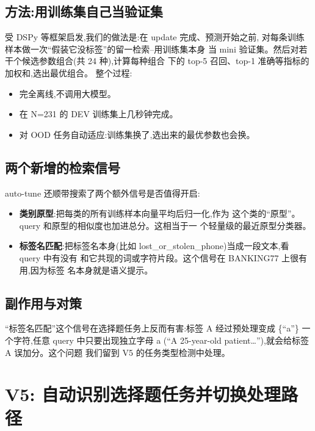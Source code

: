 \documentclass[10pt,twocolumn,letterpaper]{article}
\begin{document}
\subsection{方法:用训练集自己当验证集}
受 DSPy 等框架启发,我们的做法是:在 update 完成、预测开始之前,
对每条训练样本做一次``假装它没标签''的留一检索--用训练集本身
当 mini 验证集。然后对若干个候选参数组合(共 24 种),计算每种组合
下的 top-5 召回、top-1 准确等指标的加权和,选出最优组合。
整个过程:
\begin{itemize}[leftmargin=*,itemsep=1pt,topsep=2pt]
\item 完全离线,不调用大模型。
\item 在 N=231 的 DEV 训练集上几秒钟完成。
\item 对 OOD 任务自动适应:训练集换了,选出来的最优参数也会换。
\end{itemize}

\subsection{两个新增的检索信号}
auto-tune 还顺带搜索了两个额外信号是否值得开启:
\begin{itemize}[leftmargin=*,itemsep=1pt,topsep=2pt]
\item \textbf{类别原型}:把每类的所有训练样本向量平均后归一化,作为
  这个类的``原型''。query 和原型的相似度也加进总分。这相当于一
  个轻量级的最近原型分类器。
\item \textbf{标签名匹配}:把标签名本身(比如
  lost\_or\_stolen\_phone)当成一段文本,看 query 中有没有
  和它共现的词或字符片段。这个信号在 BANKING77 上很有用,因为标签
  名本身就是语义提示。
\end{itemize}

\subsection{副作用与对策}
``标签名匹配''这个信号在选择题任务上反而有害:标签 A
经过预处理变成 \{``a''\} 一个字符,任意 query 中只要出现独立字母 a
(``A 25-year-old patient\dots''),就会给标签 A 误加分。这个问题
我们留到 V5 的任务类型检测中处理。

\section{V5: 自动识别选择题任务并切换处理路径}
\label{sec:v5}
\end{document}

